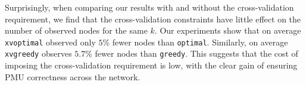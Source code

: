 Surprisingly, when comparing our results with and without the cross-validation requirement, we find that the cross-validation constraints have little effect on the number of observed nodes for the same $k$. Our experiments show that on average {\tt xvoptimal} observed only $5\%$ fewer nodes than {\tt optimal}.  Similarly, on average {\tt xvgreedy} observes
 $5.7\%$ fewer nodes than {\tt greedy}. This suggests that the cost of imposing the cross-validation requirement is low, with the clear gain of ensuring PMU correctness across the network.



